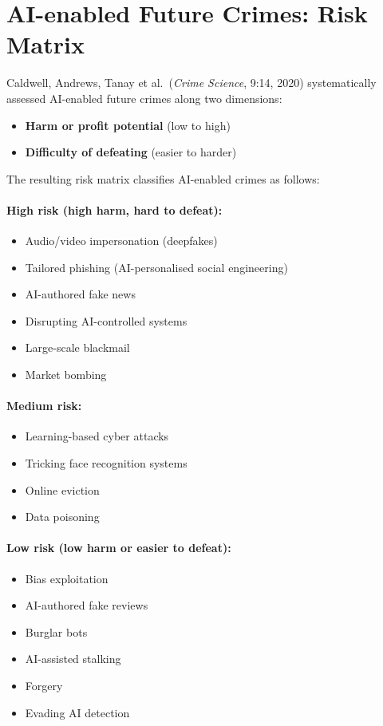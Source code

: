 \documentclass[11pt,a4paper,openany]{report}
\theoremstyle{definition}
\theoremstyle{plain}
\theoremstyle{remark}
\begin{document}
\section{AI-enabled Future Crimes: Risk Matrix}

Caldwell, Andrews, Tanay et al.\ (\textit{Crime Science}, 9:14, 2020) systematically assessed AI-enabled future crimes along two dimensions:
\begin{itemize}
    \item \textbf{Harm or profit potential} (low to high)
    \item \textbf{Difficulty of defeating} (easier to harder)
\end{itemize}

The resulting risk matrix classifies AI-enabled crimes as follows:

\paragraph{High risk (high harm, hard to defeat):}
\begin{itemize}
    \item Audio/video impersonation (deepfakes)
    \item Tailored phishing (AI-personalised social engineering)
    \item AI-authored fake news
    \item Disrupting AI-controlled systems
    \item Large-scale blackmail
    \item Market bombing
\end{itemize}

\paragraph{Medium risk:}
\begin{itemize}
    \item Learning-based cyber attacks
    \item Tricking face recognition systems
    \item Online eviction
    \item Data poisoning
\end{itemize}

\paragraph{Low risk (low harm or easier to defeat):}
\begin{itemize}
    \item Bias exploitation
    \item AI-authored fake reviews
    \item Burglar bots
    \item AI-assisted stalking
    \item Forgery
    \item Evading AI detection
\end{itemize}
\end{document}
